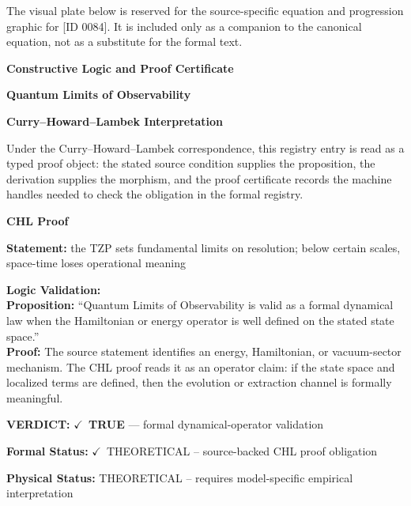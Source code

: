 \begingroup\footnotesize\sloppy
The visual plate below is reserved for the source-specific equation and progression graphic for [ID 0084]. It is included only as a companion to the canonical equation, not as a substitute for the formal text.
\par\endgroup
\ifTZPDarkEdition
{}
\fi

\clearpage
\begingroup\tzpsupportsetup
\noindent\textbf{\fontsize{10.8pt}{12.8pt}\selectfont [ID 0084] Constructive Logic and Proof Certificate}\par
\noindent\textbf{\fontsize{10pt}{12pt}\selectfont Quantum Limits of Observability}\par
\vspace{0.45em}
\begingroup
\footnotesize
\setlength{\parskip}{0.22em}
\setlength{\parindent}{0pt}
\noindent\textbf{Curry--Howard--Lambek Interpretation}\par
Under the Curry--Howard--Lambek correspondence, this registry entry is read as a typed proof
object: the stated source condition supplies the proposition, the derivation supplies the
morphism, and the proof certificate records the machine handles needed to check the obligation
in the formal registry.

\vspace{0.45em}
\noindent\textbf{CHL Proof}\par
\textbf{Statement:} the TZP sets fundamental limits on resolution; below certain scales, space-time loses
operational meaning

\textbf{Logic Validation:}\\
\textbf{Proposition:} ``Quantum Limits of Observability is valid as a formal dynamical law when the Hamiltonian
or energy operator is well defined on the stated state space.''\\
\textbf{Proof:} The source statement identifies an energy, Hamiltonian, or vacuum-sector mechanism. The
CHL proof reads it as an operator claim: if the state space and localized terms are
defined, then the evolution or extraction channel is formally meaningful.

\textbf{VERDICT:} \ensuremath{\checkmark}\ \textbf{TRUE} --- formal dynamical-operator validation

\textbf{Formal Status:} \ensuremath{\checkmark}\ THEORETICAL -- source-backed CHL proof obligation

\textbf{Physical Status:} THEORETICAL -- requires model-specific empirical interpretation
\par\vspace{0.45em}
\par
\ifTZPDarkEdition
{}
\fi
\endgroup
\endgroup
